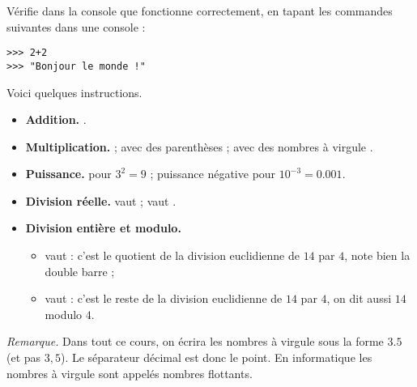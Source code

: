 \documentclass[11pt,class=report,crop=false]{standalone}
\begin{document}




\begin{cours}

Vérifie dans la console que \Python{} fonctionne correctement, en tapant les commandes suivantes dans une console \Python{} :
\begin{lstlisting}
>>> 2+2
>>> "Bonjour le monde !"
\end{lstlisting}

Voici quelques instructions.
\begin{itemize}
  \item \textbf{Addition.} .
  \item \textbf{Multiplication.} 
   ; avec des parenthèses  ; avec des nombres à virgule .
  \item \textbf{Puissance.}  pour $3^2=9$ ; puissance négative  pour $10^{-3} = 0.001$.
  \item \textbf{Division réelle.}  vaut  ;  vaut .
  \item \textbf{Division entière et modulo.}
  \begin{itemize}
    \item {} vaut  : c'est le quotient de la division euclidienne de $14$ par $4$, note bien la double barre ;
    \item {} vaut  : c'est le reste de la division euclidienne de $14$ par $4$, on dit aussi \og{}$14$ modulo $4$\fg.
  \end{itemize}
\end{itemize}

\emph{Remarque.} Dans tout ce cours, on écrira les \og{}nombres à virgule\fg{} sous la forme $3.5$ (et pas $3,5$). Le séparateur décimal est donc le point. En informatique les nombres à virgule sont appelés \og{}nombres flottants\fg{}.
\end{cours}
\end{document}
